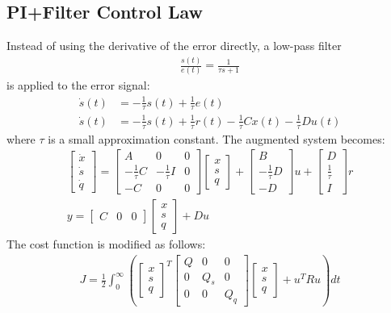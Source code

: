 \subsection*{PI+Filter Control Law}
Instead of using the derivative of the error directly, a low-pass filter 
\begin{align*}
    \frac{s(t)}{e(t)}=\frac{1}{\tau s+1}
\end{align*}
is applied to the error signal:
\begin{align*}
\dot{s}(t)&=- \frac{1}{\tau} s(t)+ \frac{1}{\tau} e(t)\\
\dot{s}(t)&=- \frac{1}{\tau} s(t)+ \frac{1}{\tau} r(t)-\frac{1}{\tau}Cx(t)-\frac{1}{\tau}Du(t)
\end{align*}
where $\tau$ is a small approximation constant. The augmented system becomes:
\begin{align*}
\begin{bmatrix}\dot{x}\\\dot{s}\\\dot{q}\end{bmatrix}=\begin{bmatrix}A & 0 & 0\\-\frac{1}{\tau}C & -\frac{1}{\tau}I & 0\\-C & 0 & 0\end{bmatrix}\begin{bmatrix}x\\s\\q\end{bmatrix}+\begin{bmatrix}B\\-\frac{1}{\tau}D\\-D\end{bmatrix}u+\begin{bmatrix}D\\\frac{1}{\tau}\\I\end{bmatrix}r\\
y=\begin{bmatrix}C & 0 & 0\end{bmatrix}\begin{bmatrix}x\\s\\q\end{bmatrix}+Du
\end{align*} 
The cost function is modified as follows:
\begin{align*}
J=\frac{1}{2}\int_{0}^{\infty} \left(\begin{bmatrix}x\\s\\q
\end{bmatrix}^T\begin{bmatrix}Q & 0 & 0\\0 & Q_s & 0\\0 & 0 & Q_q
\end{bmatrix}\begin{bmatrix}x\\s\\q
\end{bmatrix} + u^T R u \right) d t
\end{align*}


